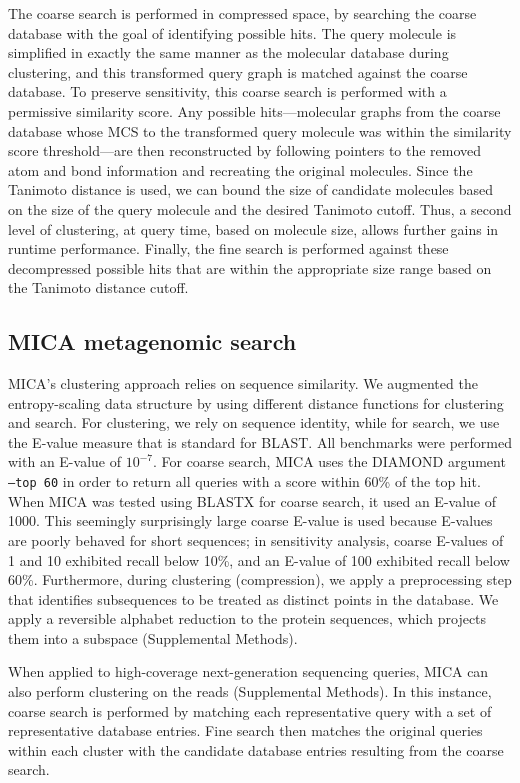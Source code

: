 \documentclass[review,preprint,12pt]{elsarticle}
\theoremstyle{definition}
\theoremstyle{remark}
\numberwithin{equation}{section}
\begin{document}
The coarse search is performed in compressed space, by searching 
the coarse database with the goal of identifying possible hits.
The query molecule is simplified in exactly the same manner as 
the molecular database during clustering, and this transformed query graph is 
matched against the coarse database.
To preserve sensitivity, this coarse search is performed with a permissive 
similarity score.
Any possible hits---molecular graphs from the coarse database whose MCS to 
the transformed query molecule was within the similarity score threshold---are 
then reconstructed by following
pointers to the removed atom and bond information and recreating the 
original molecules.
Since the Tanimoto distance is used, we can bound the size of candidate 
molecules based on the size of the query molecule and the desired Tanimoto 
cutoff.
Thus, a second level of clustering, at query time, based on molecule size, 
allows further gains in runtime performance.
Finally, the fine search is performed against these decompressed possible 
hits that are within the appropriate size range based on the Tanimoto distance
cutoff.

\subsection{MICA metagenomic search}
MICA's clustering approach relies on sequence similarity.
We augmented the entropy-scaling data structure by using
different distance functions for clustering and search.
For clustering, we rely on sequence identity, while for search, we use the
E-value measure that is standard for BLAST.
All benchmarks were performed with an E-value of $10^{-7}$. For coarse search, MICA uses the DIAMOND argument \texttt{--top 60} in order to return all queries
with a score within 60\% of the top hit.
When MICA was tested using BLASTX for coarse search, it used an E-value of 
1000.
This seemingly surprisingly large coarse E-value is used because E-values are poorly behaved for short sequences; in sensitivity analysis, coarse E-values of 1 and 10 exhibited recall below 10\%, and an E-value of 100 exhibited recall below 60\%.
Furthermore, during clustering (compression), we apply a preprocessing step that
identifies subsequences to be treated as distinct points in the database.
We apply a reversible alphabet reduction to the
protein sequences, which projects them into a subspace (Supplemental Methods).

When applied to high-coverage next-generation sequencing queries, MICA can also perform clustering on the reads (Supplemental Methods).
In this instance, coarse search is performed by matching each representative query with a set of representative database entries.
Fine search then matches the original queries within each cluster with the candidate database entries resulting from the coarse search.
\end{document}
